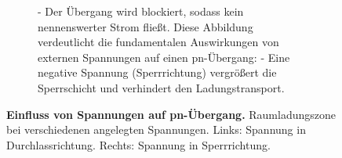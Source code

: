{\begin{figure}[H]
\begin{minipage}[c]{0.48\textwidth}
\begin{figure}[H]
{                    - Der Übergang wird blockiert, sodass kein nennenswerter Strom fließt.
                    Diese Abbildung verdeutlicht die fundamentalen Auswirkungen von externen Spannungen auf einen pn-Übergang:
                    - Eine negative Spannung (Sperrrichtung) vergrößert die Sperrschicht und verhindert den Ladungstransport.  }
            \end{figure}
        \end{minipage}
        \caption{\textbf{Einfluss von Spannungen auf pn-Übergang.} Raumladungszone bei verschiedenen angelegten
            Spannungen. Links: Spannung in Durchlassrichtung. Rechts: Spannung in Sperrrichtung.}
        \label{fig:EinflussVonSpannungenAufPn-Uebergang}
    \end{figure}
}


